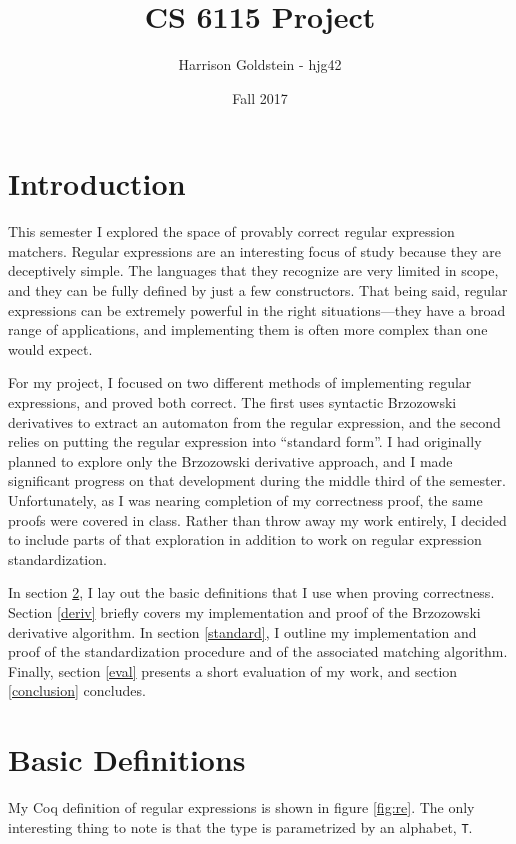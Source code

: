 \documentclass{article}
\author{Harrison Goldstein - hjg42}
\title{CS 6115 Project}
\date{Fall 2017}
\newcommand{\coq}[1]{\texttt{#1}}
\begin{document}
\maketitle

\section{Introduction}
This semester I explored the space of provably correct regular expression
matchers. Regular expressions are an interesting focus of study because they are
deceptively simple. The languages that they recognize are very limited in scope,
and they can be fully defined by just a few constructors. That being said,
regular expressions can be extremely powerful in the right situations---they
have a broad range of applications, and implementing them is often more complex
than one would expect.

For my project, I focused on two different methods of implementing regular
expressions, and proved both correct. The first uses syntactic Brzozowski
derivatives to extract an automaton from the regular expression, and the second
relies on putting the regular expression into ``standard form''. I had
originally planned to explore only the Brzozowski derivative approach, and I
made significant progress on that development during the middle third of the
semester. Unfortunately, as I was nearing completion of my correctness proof,
the same proofs were covered in class. Rather than throw away my work entirely,
I decided to include parts of that exploration in addition to work on regular
expression standardization.

In section \ref{defs}, I lay out the basic definitions that I use when proving
correctness. Section \ref{deriv} briefly covers my implementation and proof of
the Brzozowski derivative algorithm. In section \ref{standard}, I outline my
implementation and proof of the standardization procedure and of the associated
matching algorithm. Finally, section \ref{eval} presents a short evaluation of
my work, and section \ref{conclusion} concludes.


\section{Basic Definitions} \label{defs}
My Coq definition of regular expressions is shown in figure \ref{fig:re}. The
only interesting thing to note is that the type is parametrized by an alphabet,
\coq{T}.
\end{document}
